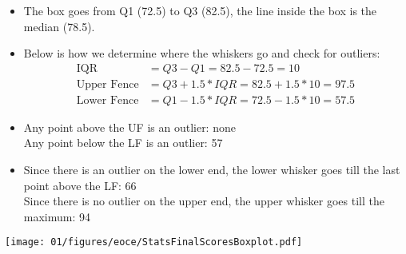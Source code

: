 {
\begin{itemize}
\item The box goes from Q1 (72.5) to Q3 (82.5), the line inside the box is the median (78.5).
\item Below is how we determine where the whiskers go and check for outliers:
\begin{align*}
\text{IQR} &= Q3 - Q1 = 82.5 - 72.5 = 10 \\
\text{Upper Fence} &= Q3 + 1.5 * IQR = 82.5 + 1.5 * 10 = 97.5 \\
\text{Lower Fence} &= Q1 - 1.5 * IQR = 72.5 - 1.5 * 10 = 57.5
\end{align*}
\end{itemize}

\begin{center}
\begin{minipage}[c]{0.47\textwidth}
\begin{itemize}
\item Any point above the UF is an outlier: none \\
Any point below the LF is an outlier: 57
\item Since there is an outlier on the lower end, the lower whisker goes till the last point above the LF: 66 \\
Since there is no outlier on the upper end, the upper whisker goes till the maximum: 94
\end{itemize}
\end{minipage}
\begin{minipage}[c]{0.45\textwidth}
\hspace{10mm} \texttt{[image: 01/figures/eoce/StatsFinalScoresBoxplot.pdf]}
\end{minipage}
\end{center}
}

%

